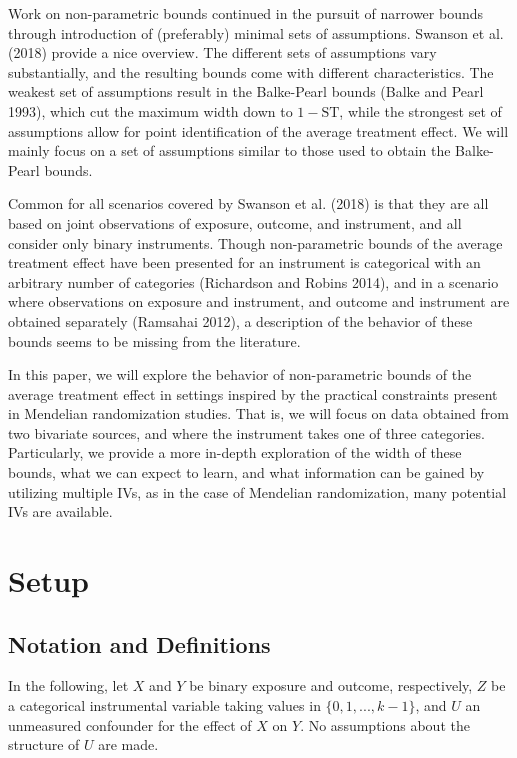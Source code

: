 \documentclass[
]{article}
\theoremstyle{plain}
\begin{document}
Work on non-parametric bounds continued in the pursuit of narrower bounds through introduction of (preferably) minimal sets of assumptions. Swanson et al. (2018) provide a nice overview. The different sets of assumptions vary substantially, and the resulting bounds come with different characteristics. The weakest set of assumptions result in the Balke-Pearl bounds (Balke and Pearl 1993), which cut the maximum width down to \(1-\text{ST}\), while the strongest set of assumptions allow for point identification of the average treatment effect. We will mainly focus on a set of assumptions similar to those used to obtain the Balke-Pearl bounds.

Common for all scenarios covered by Swanson et al. (2018) is that they are all based on joint observations of exposure, outcome, and instrument, and all consider only binary instruments. Though non-parametric bounds of the average treatment effect have been presented for an instrument is categorical with an arbitrary number of categories (Richardson and Robins 2014), and in a scenario where observations on exposure and instrument, and outcome and instrument are obtained separately (Ramsahai 2012), a description of the behavior of these bounds seems to be missing from the literature.

In this paper, we will explore the behavior of non-parametric bounds of the average treatment effect in settings inspired by the practical constraints present in Mendelian randomization studies. That is, we will focus on data obtained from two bivariate sources, and where the instrument takes one of three categories. Particularly, we provide a more in-depth exploration of the width of these bounds, what we can expect to learn, and what information can be gained by utilizing multiple IVs, as in the case of Mendelian randomization, many potential IVs are available.

\hypertarget{setup}{%
\section{Setup}\label{setup}}

\hypertarget{notation-and-definitions}{%
\subsection{Notation and Definitions}\label{notation-and-definitions}}

In the following, let \(X\) and \(Y\) be binary exposure and outcome, respectively, \(Z\) be a categorical instrumental variable taking values in \(\{0, 1, ..., k-1\}\), and \(U\) an unmeasured confounder for the effect of \(X\) on \(Y\). No assumptions about the structure of \(U\) are made.
\end{document}
